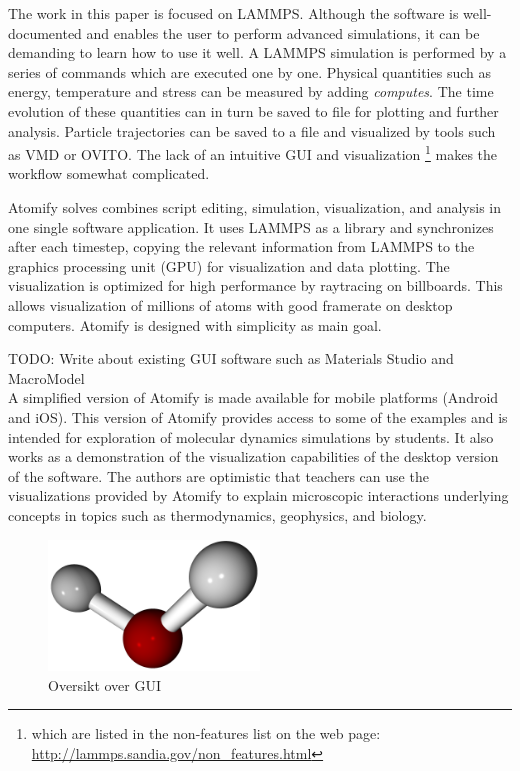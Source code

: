 \documentclass[aps,pre,twocolumn,letterpaper,floatfix]{revtex4}
\begin{document}
The work in this paper is focused on LAMMPS.
Although the software is well-documented and enables the user to perform
advanced simulations, it can be demanding to learn how to use it well.
A LAMMPS simulation is performed by a series of commands which are executed one by
one.
Physical quantities such as energy, temperature and stress can be measured by
adding \textit{computes}.
The time evolution of these quantities can in turn be saved to file for plotting
and further analysis.
Particle trajectories can be saved to a file and visualized by tools such as
VMD\cite{Humphrey1996Vmd} or OVITO\cite{Stukowski2009Visualization}.
The lack of an intuitive GUI and visualization \footnote{which are listed in the
non-features list on the web page:
\url{http://lammps.sandia.gov/non_features.html}} makes the workflow somewhat
complicated.

Atomify solves combines script editing, simulation,
visualization, and analysis in one single software application.
It uses LAMMPS as a library and synchronizes after each timestep,
copying the relevant information from LAMMPS to the graphics processing unit
(GPU) for visualization and data plotting.
The visualization is optimized for high performance by raytracing on billboards.
This allows visualization of millions of atoms with good framerate on desktop
computers. Atomify is designed with simplicity as main goal.

TODO: Write about existing GUI software such as Materials Studio and MacroModel \\

A simplified version of Atomify is made available for mobile platforms (Android
and iOS).
This version of Atomify provides access to some of the examples and is intended
for exploration of molecular dynamics simulations by students.
It also works as a demonstration of the visualization capabilities of the
desktop version of the software.
The authors are optimistic that teachers can use the visualizations provided by
Atomify to explain microscopic interactions underlying concepts in topics such
as thermodynamics, geophysics, and biology.

\begin{figure}
	\centering
	\includegraphics[width=0.5\textwidth]{final_billboard.png}
	\caption{Oversikt over GUI}
	\label{fig:gui}
\end{figure}
\end{document}

